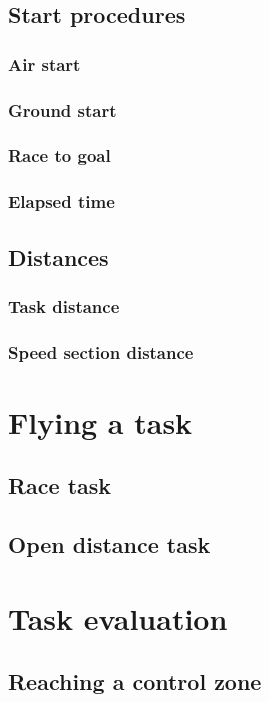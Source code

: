 \documentclass{article}
\begin{document}
\subsection{Start procedures}
\subsubsection{Air start}
\subsubsection{Ground start}
\subsubsection{Race to goal}
\subsubsection{Elapsed time}
\subsection{Distances}
\subsubsection{Task distance}
\label{sec:task-distance}
\subsubsection{Speed section distance}

\newpage
\section{Flying a task}
\subsection{Race task}
\subsection{Open distance task}

\newpage
\section{Task evaluation}
\subsection{Reaching a control zone}
\end{document}
